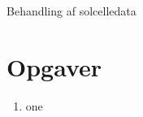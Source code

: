 \documentclass[12pt]{article}
\begin{document}


\begin{center}
\Huge
Behandling af solcelledata
\end{center}

\section*{Opgaver}

\begin{enumerate}[label=\roman*)]
	\item one
\end{enumerate}
\end{document}
